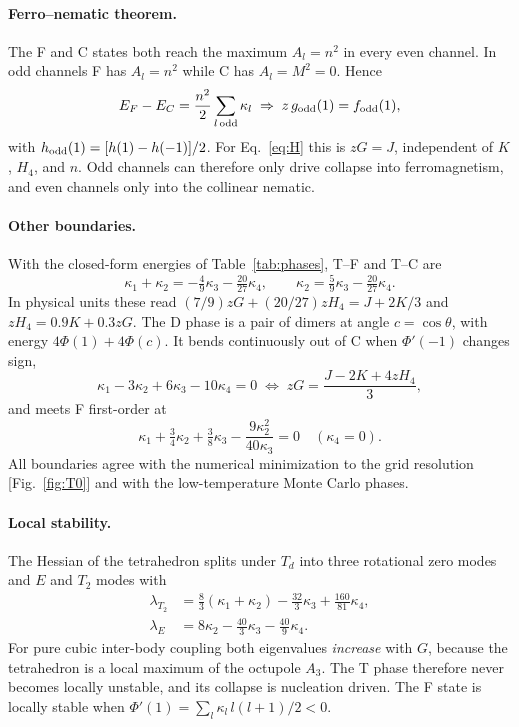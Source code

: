 \documentclass[pre,twocolumn,superscriptaddress,amsmath,amssymb,floatfix]{revtex4-2}
\begin{document}
\paragraph*{Ferro--nematic theorem.} The F and C states both reach the maximum $A_l=n^2$ in every even channel. In odd channels F has $A_l=n^2$ while C has $A_l=M^2=0$. Hence
\begin{equation}
E_F-E_C=\frac{n^2}{2}\sum_{l\,{\rm odd}}\kappa_l\;\Rightarrow\;
z\,g_{\rm odd}(1)=f_{\rm odd}(1),
\label{eq:CF}
\end{equation}
with $h_{\rm odd}(1)=[h(1)-h(-1)]/2$. For Eq.~\eqref{eq:H} this is $zG=J$, independent of $K$, $H_4$, and $n$. Odd channels can therefore only drive collapse into ferromagnetism, and even channels only into the collinear nematic.

\paragraph*{Other boundaries.} With the closed-form energies of Table~\ref{tab:phases}, T--F and T--C are
\begin{equation}
\kappa_1+\kappa_2=-\tfrac49\kappa_3-\tfrac{20}{27}\kappa_4,\qquad
\kappa_2=\tfrac59\kappa_3-\tfrac{20}{27}\kappa_4.
\label{eq:TF}
\end{equation}
In physical units these read $(7/9)zG+(20/27)zH_4=J+2K/3$ and $zH_4=0.9K+0.3zG$. The D phase is a pair of dimers at angle $c=\cos\theta$, with energy $4\Phi(1)+4\Phi(c)$. It bends continuously out of C when $\Phi'(-1)$ changes sign,
\begin{equation}
\kappa_1-3\kappa_2+6\kappa_3-10\kappa_4=0\;\Leftrightarrow\;zG=\frac{J-2K+4zH_4}{3},
\label{eq:CD}
\end{equation}
and meets F first-order at
\begin{equation}
\kappa_1+\tfrac34\kappa_2+\tfrac38\kappa_3-\frac{9\kappa_2^2}{40\kappa_3}=0\quad(\kappa_4=0).
\label{eq:DF}
\end{equation}
All boundaries agree with the numerical minimization to the grid resolution [Fig.~\ref{fig:T0}] and with the low-temperature Monte Carlo phases.

\paragraph*{Local stability.} The Hessian of the tetrahedron splits under $T_d$ into three rotational zero modes and $E$ and $T_2$ modes with
\begin{align}
\lambda_{T_2}&=\tfrac83(\kappa_1+\kappa_2)-\tfrac{32}{3}\kappa_3+\tfrac{160}{81}\kappa_4,\nonumber\\
\lambda_E&=8\kappa_2-\tfrac{40}{3}\kappa_3-\tfrac{40}{9}\kappa_4.
\end{align}
For pure cubic inter-body coupling both eigenvalues \emph{increase} with $G$, because the tetrahedron is a local maximum of the octupole $A_3$. The T phase therefore never becomes locally unstable, and its collapse is nucleation driven. The F state is locally stable when $\Phi'(1)=\sum_l\kappa_l\,l(l+1)/2<0$.
\end{document}
